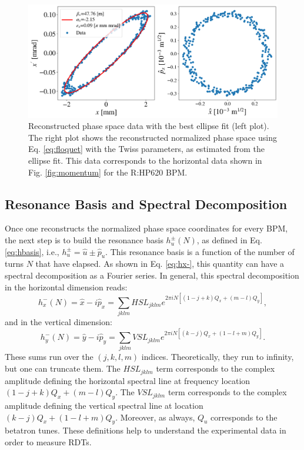 \begin{figure}[H]
    \centering
    \includegraphics[width=\columnwidth]{chapter4/ellipse_data.png}
    \caption{Reconstructed phase space data with the best ellipse fit (left plot). The right plot shows the reconstructed normalized phase space using Eq. \ref{eq:floquet} with the Twiss parameters, as estimated from the ellipse fit. This data corresponds to the horizontal data shown in Fig. \ref{fig:momentum} for the R:HP620 BPM.}
    \label{fig:ellipse}
\end{figure}

\subsection{Resonance Basis and Spectral Decomposition}

Once one reconstructs the normalized phase space coordinates for every BPM, the next step is to build the resonance basis $h_u^{\pm}(N)$, as defined in Eq. \ref{eq:hbasis}, i.e., $h_u^{\pm}=\hat{u}\pm \hat{p}_u$. This resonance basis is a function of the number of turns $N$ that have elapsed. As shown in Eq. \ref{eq:hx-}, this quantity can have a spectral decomposition as a Fourier series. In general, this spectral decomposition in the horizontal dimension reads: 
\begin{equation}
    \label{eq:hxspect}
    h_x^{-}(N)= \hat{x} - i\hat{p}_x = \sum_{jklm}HSL_{jklm}e^{2\pi i N \left[ \left( 1-j+k\right)Q_x+\left( m-l \right)Q_y\right]},
\end{equation}
and in the vertical dimension:
\begin{equation}
    \label{eq:hyspect}
    h_y^{-}(N)= \hat{y} - i\hat{p}_y = \sum_{jklm}VSL_{jklm}e^{2\pi i N \left[ \left( k-j\right)Q_x+\left(1-l+m \right)Q_y\right]}.
\end{equation}
These sums run over the $(j,k,l,m)$ indices. Theoretically, they run to infinity, but one can truncate them. The $HSL_{jklm}$ term corresponds to the complex amplitude defining the horizontal spectral line at frequency location $(1-j+k)Q_x+(m-l)Q_y$. The $VSL_{jklm}$ term corresponds to the complex amplitude defining the vertical spectral line at location $(k-j)Q_x+(1-l+m)Q_y$. Moreover, as always, $Q_u$ corresponds to the betatron tunes. These definitions help to understand the experimental data in order to measure RDTs.

